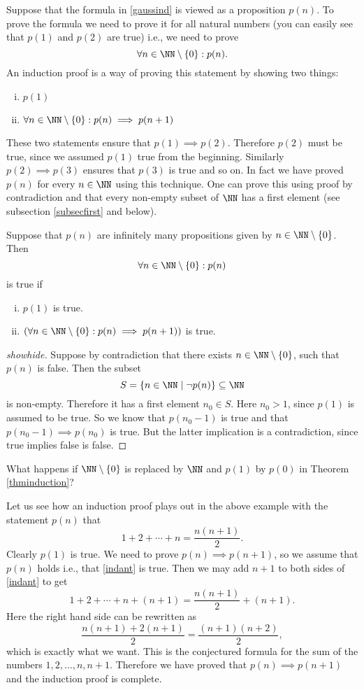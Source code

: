 \documentclass{article}
\begin{document}
Suppose that the formula in \eqref{gaussind} is viewed as a
proposition $p(n)$. To prove the formula we need to prove it for all
natural numbers (you can easily see that $p(1)$ and $p(2)$ are true) i.e.,
we need to prove
$$
\forall n\in \NN\setminus\{0\}: p(n).
$$
An induction proof is a way of proving this statement by showing two things:
\begin{enumerate}[(i)]
\item
  $p(1)$
\item
  $\forall n\in \NN\setminus\{0\}: p(n)\implies p(n+1)$
\end{enumerate}
These two statements ensure that $p(1) \implies p(2)$. Therefore
$p(2)$ must be true, since we assumed $p(1)$ true from the
beginning. Similarly $p(2)\implies p(3)$ ensures that $p(3)$
is true and so on. In fact we have proved $p(n)$ for every $n\in \NN$
using this technique. One can prove this using proof by
contradiction and that every non-empty subset
of $\NN$ has a first element (see subsection \ref{subsecfirst} and below).

\begin{theorem}[emph]\label{thminduction}
  Suppose that $p(n)$ are infinitely many propositions given by $n\in \NN\setminus\{0\}$. Then
  $$
  \forall n\in \NN\setminus\{0\}: p(n)
  $$
  is true if
\begin{enumerate}[(i)]
\item
  $p(1)$ is true.
\item
  $\left(\forall n\in \NN\setminus\{0\}: p(n)\implies p(n+1)\right)$ is true.
\end{enumerate}
\end{theorem}

\begin{proof}[showhide]
Suppose by contradiction that there exists $n\in \NN\setminus\{0\}$, such that
$p(n)$ is false. Then the subset
$$
S = \{n\in \NN \mid \neg p(n)\}\subseteq \NN
$$
is non-empty. Therefore it has a first element $n_0\in S$. 
Here $n_0 > 1$, since $p(1)$ is assumed to be true. So we
know that $p(n_0-1)$ is true and that
$p(n_0-1)\implies p(n_0)$ is true. But the latter
implication is a contradiction, since true implies
false is false.
\end{proof}

\beginshex
What happens if $\NN\setminus\{0\}$ is replaced by $\NN$ and $p(1)$ by $p(0)$ in Theorem \ref{thminduction}?
\endshex


Let us see how an induction proof plays out in the above example
with the statement $p(n)$ that
\begin{equation}\label{indant}
1 + 2 + \cdots + n = \frac{n(n+1)}{2}.
\end{equation}
Clearly $p(1)$ is true. We need to prove $p(n)\implies p(n+1)$, so
we assume that $p(n)$ holds i.e., that \eqref{indant} is true.
Then we may add $n+1$ to both sides of \eqref{indant} to get
$$
1 + 2 + \cdots + n + (n+1) = \frac{n(n+1)}{2} + (n+1).
$$
Here the right hand side can be rewritten as
$$
\frac{n(n+1) + 2(n+1)}{2} = \frac{(n+1)(n+2)}{2},
$$
which is exactly what we want. This is the conjectured formula for
the sum of the numbers $1, 2, \dots, n, n+1$. Therefore
we have proved that $p(n)\implies p(n+1)$ and the induction
proof is complete.
\end{document}
